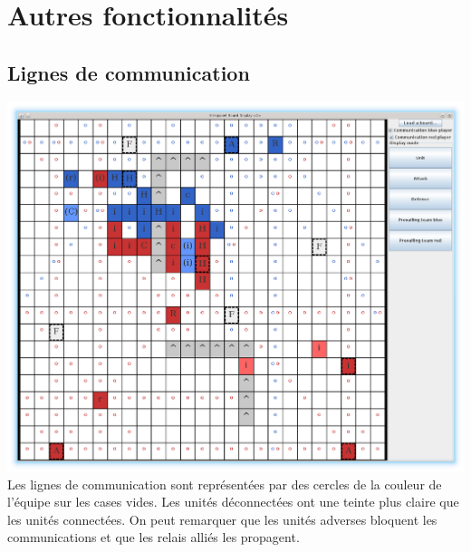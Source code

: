 			\clearpage

	\section{Autres fonctionnalités}

		\subsection{Lignes de communication}
			\includegraphics[scale=0.4]{images/screen4.eps}
			Les lignes de communication sont représentées par des cercles de la couleur de l'équipe sur les cases vides.
			Les unités déconnectées ont une teinte plus claire que les unités connectées.
			On peut remarquer que les unités adverses bloquent les communications et que les relais alliés les propagent.

			\clearpage